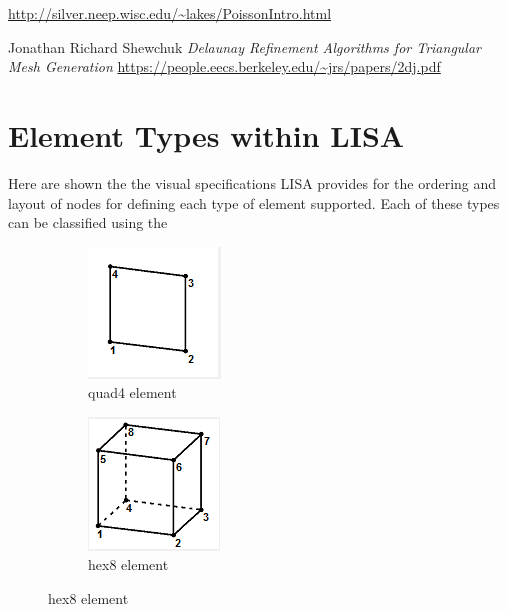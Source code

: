 \begin{changemargin}{\CMwidth}{\CMheight}
\begin{thebibliography}{9}
 \url{http://silver.neep.wisc.edu/~lakes/PoissonIntro.html}

 Jonathan Richard Shewchuk \emph{Delaunay Refinement Algorithms
for Triangular Mesh Generation} \url{https://people.eecs.berkeley.edu/~jrs/papers/2dj.pdf}



\end{thebibliography}
\appendix

\section{Element Types within LISA}
Here are shown the the visual specifications LISA provides for the ordering and layout of nodes for defining each type of element supported. Each of these types can be classified using the

\begin{figure}[!h]
\centering
\begin{subfigure}{.5\textwidth}
  \centering
  \includegraphics[width=0.3\linewidth]{../Graphics/LISA-quad4.png}
  \caption{quad4 element}
  \label{fig:sub1}
\end{subfigure}%
\begin{subfigure}{.5\textwidth}
  \centering
  \includegraphics[width=0.3\linewidth]{../Graphics/LISA-hex8.png}
  \caption{hex8 element}
  \label{fig:sub2}
\end{subfigure}
\label{fig:test}
\end{figure}



\end{changemargin}
